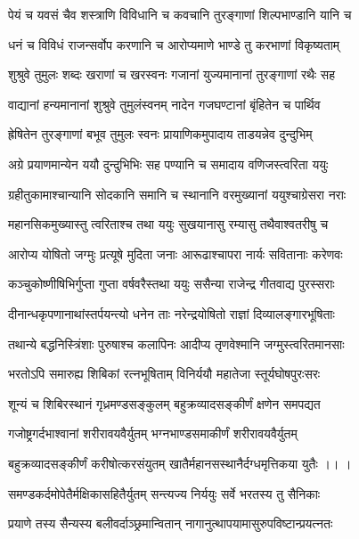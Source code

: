 \twolineshloka
{पेयं च यवसं चैव शस्त्राणि विविधानि च}
{कवचानि तुरङ्गाणां शिल्पभाण्डानि यानि च}%

\twolineshloka
{धनं च विविधं राजन्सर्वोप करणानि च}
{आरोप्यमाणे भाण्डे तु करभाणां विकृष्यताम्}%

\twolineshloka
{शुश्रुवे तुमुलः शब्दः खराणां च खरस्वनः}
{गजानां युज्यमानानां तुरङ्गाणां रथैः सह}%

\twolineshloka
{वाद्यानां हन्यमानानां शुश्रुवे तुमुलंस्वनम्}
{नादेन गजघण्टानां बृंहितेन च पार्थिव} %

\twolineshloka
{ह्रेषितेन तुरङ्गाणां बभूव तुमुलः स्वनः}
{प्रायाणिकमुपादाय ताडयन्नेव दुन्दुभिम्}%

\twolineshloka
{अग्रे प्रयाणमान्येन ययौ दुन्दुभिभिः सह}
{पण्यानि च समादाय वणिजस्त्वरिता ययुः}%

\twolineshloka
{ग्रहीतुकामाश्चान्यानि सोदकानि समानि च}
{स्थानानि वरमुख्यानां ययुश्चाग्रेसरा नराः}%

\twolineshloka
{महानसिकमुख्यास्तु त्वरिताश्च तथा ययुः}
{सुखयानासु रम्यासु तथैवाश्वतरीषु च}%

\twolineshloka
{आरोप्य योषितो जग्मुः प्रत्यूषे मुदिता जनाः}
{आरूढाश्चापरा नार्यः सवितानाः करेणवः}%

\twolineshloka
{कञ्चुकोष्णीषिभिर्गुप्ता गुप्ता वर्षवरैस्तथा}
{ययुः ससैन्या राजेन्द्र गीतवाद्य पुरस्सराः}%

\twolineshloka
{दीनान्धकृपणानाथांस्तर्पयन्त्यो धनेन ताः}
{नरेन्द्रयोषितो राज्ञां दिव्यालङ्गारभूषिताः}%

\twolineshloka
{तथान्ये बद्धनिस्त्रिंशाः पुरुषाश्च कलापिनः}
{आदीप्य तृणवेश्मानि जग्मुस्त्वरितमानसाः}%

\twolineshloka
{भरतोऽपि समारुह्य शिबिकां रत्नभूषिताम्}
{विनिर्ययौ महातेजा स्तूर्यघोषपुरःसरः}%

\twolineshloka
{शून्यं च शिबिरस्थानं गृध्रमण्डसङ्कुलम्}
{बहुक्रव्यादसङ्कीर्णं क्षणेन समपद्यत} %

\twolineshloka
{गजोष्ट्रगर्दभाश्वानां शरीरावयवैर्युतम्}
{भग्नभाण्डसमाकीर्णं शरीरावयवैर्युतम्}%

\twolineshloka
{बहुक्रव्यादसङ्कीर्णं करीषोत्करसंयुतम्}
{खातैर्महानसस्थानैर्दग्धमृत्तिकया युतैः ।। ।}%

\twolineshloka
{समण्डकर्दमोपेतैर्मक्षिकासहितैर्युतम्}
{सन्त्यज्य निर्ययुः सर्वे भरतस्य तु सैनिकाः}%

\twolineshloka
{प्रयाणे तस्य सैन्यस्य बलीवर्दाञ्छ्रमान्वितान्}
{नागानुत्थापयामासुरुपविष्टान्प्रयत्नतः}%

